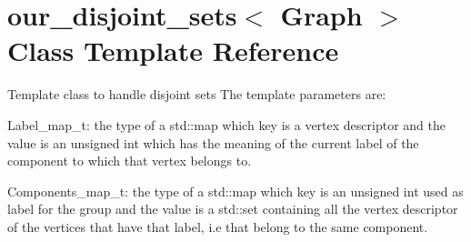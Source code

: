 \hypertarget{classour__disjoint__sets}{
\section{our\_\-disjoint\_\-sets$<$ Graph $>$ Class Template Reference}
\label{classour__disjoint__sets}
}


Template class to handle disjoint sets  The template parameters are:\par
 Label\_\-map\_\-t: the type of a std::map which key is a vertex descriptor and the value is an unsigned int which has the meaning of the current label of the component to which that vertex belongs to.\par
 Components\_\-map\_\-t: the type of a std::map which key is an unsigned int used as label for the group and the value is a std::set containing all the vertex descriptor of the vertices that have that label, i.e that belong to the same component.  


